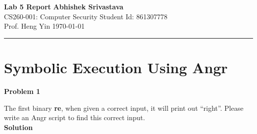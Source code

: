 \documentclass[a4paper, 12pt]{article}
\begin{document}
\noindent
\large\textbf{Lab 5 Report} \hfill \textbf{Abhishek Srivastava} \\
\normalsize CS260-001: Computer Security \hfill Student Id: 861307778 \\
\normalsize Prof. Heng Yin \hfill \today \\
\hrule

\section*{Symbolic Execution Using Angr}

\textbf{Problem 1}

The first binary \textbf{re}, when given a correct input, it will print out “right”. Please write an Angr script to find this correct input.\\

\noindent
\textbf{Solution}
\end{document}
